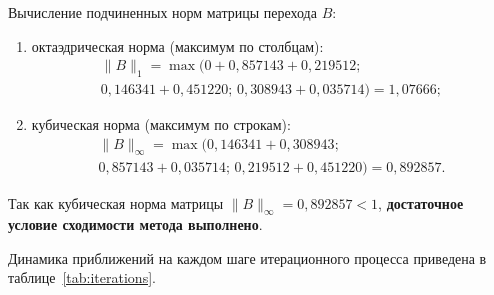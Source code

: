 Вычисление подчиненных норм матрицы перехода $B$:
\begin{enumerate}
    \item октаэдрическая норма (максимум по столбцам):
    \begin{multline*}
        \|B\|_1 = \max\big(0 + 0{,}857143 + 0{,}219512;\, \\
        0{,}146341 + 0{,}451220;\, 0{,}308943 + 0{,}035714\big) = 1{,}07666;
    \end{multline*}
    \item кубическая норма (максимум по строкам):
    \begin{multline*}
        \|B\|_\infty = \max\big(0{,}146341 + 0{,}308943;\, \\
        0{,}857143 + 0{,}035714;\, 0{,}219512 + 0{,}451220\big) = 0{,}892857.
    \end{multline*}
\end{enumerate}

Так как кубическая норма матрицы $\|B\|_\infty = 0{,}892857 < 1$, \textbf{достаточное условие сходимости метода выполнено}.

Динамика приближений на каждом шаге итерационного процесса приведена в таблице~\ref{tab:iterations}.

